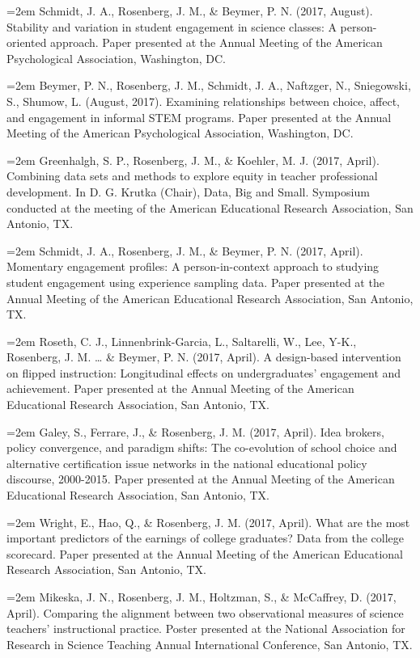 \documentclass[]{article}
\begin{document}
\hangindent=2em Schmidt, J. A., Rosenberg, J. M., \& Beymer, P. N.
(2017, August). Stability and variation in student engagement in science
classes: A person-oriented approach. Paper presented at the Annual
Meeting of the American Psychological Association, Washington, DC.

\hangindent=2em Beymer, P. N., Rosenberg, J. M., Schmidt, J. A.,
Naftzger, N., Sniegowski, S., Shumow, L. (August, 2017). Examining
relationships between choice, affect, and engagement in informal STEM
programs. Paper presented at the Annual Meeting of the American
Psychological Association, Washington, DC.

\hangindent=2em Greenhalgh, S. P., Rosenberg, J. M., \& Koehler, M. J.
(2017, April). Combining data sets and methods to explore equity in
teacher professional development. In D. G. Krutka (Chair), Data, Big and
Small. Symposium conducted at the meeting of the American Educational
Research Association, San Antonio, TX.

\hangindent=2em Schmidt, J. A., Rosenberg, J. M., \& Beymer, P. N.
(2017, April). Momentary engagement profiles: A person-in-context
approach to studying student engagement using experience sampling data.
Paper presented at the Annual Meeting of the American Educational
Research Association, San Antonio, TX.

\hangindent=2em Roseth, C. J., Linnenbrink-Garcia, L., Saltarelli, W.,
Lee, Y-K., Rosenberg, J. M. \ldots{} \& Beymer, P. N. (2017, April). A
design-based intervention on flipped instruction: Longitudinal effects
on undergraduates' engagement and achievement. Paper presented at the
Annual Meeting of the American Educational Research Association, San
Antonio, TX.

\hangindent=2em Galey, S., Ferrare, J., \& Rosenberg, J. M. (2017,
April). Idea brokers, policy convergence, and paradigm shifts: The
co-evolution of school choice and alternative certification issue
networks in the national educational policy discourse, 2000-2015. Paper
presented at the Annual Meeting of the American Educational Research
Association, San Antonio, TX.

\hangindent=2em Wright, E., Hao, Q., \& Rosenberg, J. M. (2017, April).
What are the most important predictors of the earnings of college
graduates? Data from the college scorecard. Paper presented at the
Annual Meeting of the American Educational Research Association, San
Antonio, TX.

\hangindent=2em Mikeska, J. N., Rosenberg, J. M., Holtzman, S., \&
McCaffrey, D. (2017, April). Comparing the alignment between two
observational measures of science teachers' instructional practice.
Poster presented at the National Association for Research in Science
Teaching Annual International Conference, San Antonio, TX.
\end{document}
